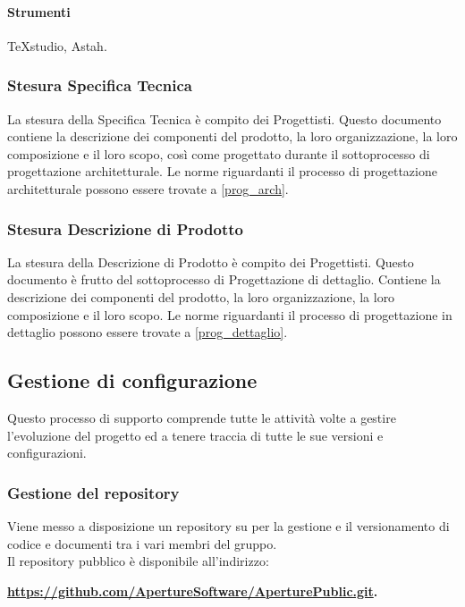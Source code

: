 \paragraph{Strumenti}
TeXstudio, Astah.

\subsubsection{Stesura Specifica Tecnica}
La stesura della Specifica Tecnica è compito dei Progettisti.
Questo documento contiene la descrizione dei componenti del prodotto, la loro organizzazione, la loro composizione e il loro scopo, così come progettato durante il sottoprocesso di progettazione architetturale.
Le norme riguardanti il processo di progettazione architetturale possono essere trovate a \ref{prog_arch}.



\subsubsection{Stesura Descrizione di Prodotto}
La stesura della Descrizione di Prodotto è compito dei Progettisti.
Questo documento è frutto del sottoprocesso di Progettazione di dettaglio. Contiene la descrizione dei componenti del prodotto, la loro organizzazione, la loro composizione e il loro scopo.
Le norme riguardanti il processo di progettazione in dettaglio possono essere trovate a \ref{prog_dettaglio}.

\subsection{Gestione di configurazione}
Questo processo di supporto comprende tutte le attività volte a gestire l'evoluzione del progetto ed a tenere traccia di tutte le sue versioni e configurazioni.

\subsubsection{Gestione del repository}
Viene messo a disposizione un repository  su  per la gestione e il versionamento di codice e documenti tra i vari membri del gruppo.\\
Il repository pubblico è disponibile all'indirizzo: \\
\begin{center}
\textbf{\url{https://github.com/ApertureSoftware/AperturePublic.git}.}
\end{center}

